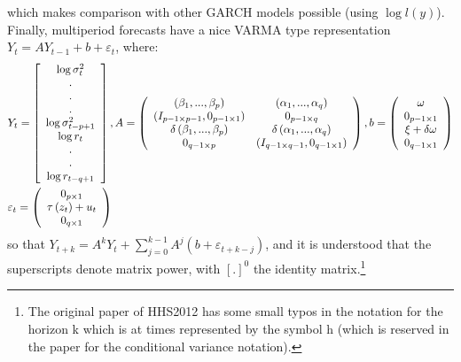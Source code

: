 which makes comparison with other GARCH models possible (using $\log l\left(y\right)$).
Finally, multiperiod forecasts have a nice VARMA type representation ${Y_t} = A{Y_{t - 1}} + b + {\varepsilon _t}$, where:
\begin{equation}
\begin{gathered}
  {Y_t} = \left[ {\begin{array}{*{20}{c}}
   {\log \sigma _t^2}  \\
   .  \\
   .  \\
   .  \\
   {\log \sigma _{t - p + 1}^2}  \\
   {\log {r_t}}  \\
   .  \\
   .  \\
   {\log {r_{t - q + 1}}}  \\

 \end{array} } \right],A = \left( {\begin{array}{*{20}{c}}
   {\left( {{\beta _1},...,{\beta _p}} \right)} & {\left( {{\alpha _1},...,{\alpha _q}} \right)}  \\
   {\left( {{I_{p - 1 \times p - 1}},{0_{p - 1 \times 1}}} \right)} & {{0_{p - 1 \times q}}}  \\
   {\delta \left( {{\beta _1},...,{\beta _p}} \right)} & {\delta \left( {{\alpha _1},...,{\alpha _q}} \right)}  \\
   {{0_{q - 1 \times p}}} & {\left( {{I_{q - 1 \times q - 1}},{0_{q - 1 \times 1}}} \right)}  \\
 \end{array} } \right),b = \left( {\begin{array}{*{20}{c}}
   \omega   \\
   {{0_{p - 1 \times 1}}}  \\
   {\xi  + \delta \omega }  \\
   {{0_{q - 1 \times 1}}}  \\
 \end{array} } \right) \hfill \\
  {\varepsilon _t} = \left( {\begin{array}{*{20}{c}}
   {{0_{p \times 1}}}  \\
   {\tau \left( {{z_t}} \right) + {u_t}}  \\
   {{0_{q \times 1}}}  \\
 \end{array} } \right) \hfill \\
\end{gathered}
\end{equation}
so that ${Y_{t + k}} = {A^k}{Y_t} + \sum\limits_{j = 0}^{k - 1} {{A^j}\left( {b + {\varepsilon _{t + k - j}}} \right)}$, and it is understood that the superscripts denote matrix power, with $\left[.\right]^0$ the identity matrix.\footnote{The original paper of HHS2012 has some small typos in the notation for the horizon k which is at times represented by the symbol h (which is reserved in the paper for the conditional variance notation).}

